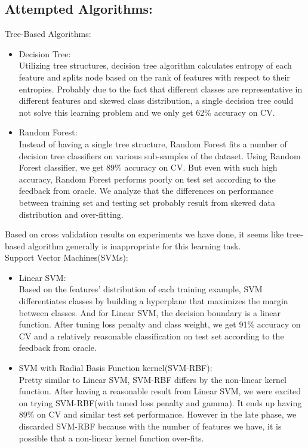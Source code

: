 \subsection{Attempted Algorithms:}
Tree-Based Algorithms:
\begin{itemize}
	\item Decision Tree:\\
	Utilizing tree structures, decision tree algorithm calculates entropy of each feature and splits node based on the rank of features with respect to their entropies. Probably due to the fact that different classes are representative in different features and skewed class distribution, a single decision tree could not solve this learning problem and we only get 62\% accuracy on CV.\\
	\item Random Forest:\\
	Instead of having a single tree structure, Random Forest fits a number of decision tree classifiers on various sub-samples of the dataset.\cite{b7} Using Random Forest classifier, we get 89\% accuracy on CV. But even with such high accuracy, Random Forest performs poorly on test set according to the feedback from oracle. We analyze that the differences on performance between training set and testing set probably result from skewed data distribution and over-fitting. \\
\end{itemize}

Based on cross validation results on experiments we have done, it seems like tree-based algorithm generally is inappropriate for this learning task. \\

Support Vector Machines(SVMs):\\
\begin{itemize}
	\item Linear SVM:\\
	Based on the features' distribution of each training example, SVM differentiates classes by building a hyperplane that maximizes the margin between classes. And for Linear SVM, the decision boundary is a linear function. After tuning loss penalty and class weight, we get 91\% accuracy on CV and a relatively reasonable classification on test set according to the feedback from oracle.\\
	\item SVM with Radial Basis Function kernel(SVM-RBF):\\
	Pretty similar to Linear SVM, SVM-RBF differs by the non-linear kernel function. After having a reasonable result from Linear SVM, we were excited on trying SVM-RBF(with tuned loss penalty and gamma). It ends up having 89\% on CV and similar test set performance. However in the late phase, we discarded SVM-RBF because with the number of features we have, it is possible that a non-linear kernel function over-fits. \\
\end{itemize}

